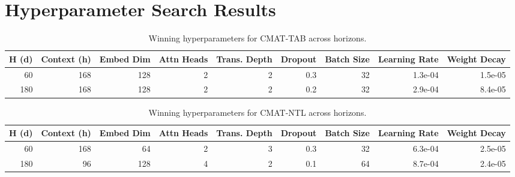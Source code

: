 \section{Hyperparameter Search Results}
\label{sec:apx:fifth_app}


\begin{table}[h]
\centering
\footnotesize
\caption{Winning hyperparameters for CMAT-TAB across horizons.}
\label{tab:hyperparams_tab}
\begin{tabular}{r r r r r r r r r}
\toprule
\textbf{H (d)} & \textbf{Context (h)} & \textbf{Embed Dim} & \textbf{Attn Heads} & \textbf{Trans. Depth} &
\textbf{Dropout} & \textbf{Batch Size} & \textbf{Learning Rate} & \textbf{Weight Decay} \\
\midrule
60 & 168 & 128 & 2 & 2 & 0.3 & 32 & 1.3e-04 & 1.5e-05 \\
180 & 168 & 128 & 2 & 2 & 0.2 & 32 & 2.9e-04 & 8.4e-05 \\
\bottomrule
\end{tabular}
\end{table}

\begin{table}[h]
\centering
\footnotesize
\caption{Winning hyperparameters for CMAT-NTL across horizons.}
\label{tab:hyperparams_ntl}
\begin{tabular}{r r r r r r r r r}
\toprule
\textbf{H (d)} & \textbf{Context (h)} & \textbf{Embed Dim} & \textbf{Attn Heads} & \textbf{Trans. Depth} &
\textbf{Dropout} & \textbf{Batch Size} & \textbf{Learning Rate} & \textbf{Weight Decay} \\
\midrule
60 & 168 & 64 & 2 & 3 & 0.3 & 32 & 6.3e-04 & 2.5e-05 \\
180 & 96 & 128 & 4 & 2 & 0.1 & 64 & 8.7e-04 & 2.4e-05 \\
\bottomrule
\end{tabular}
\end{table}

